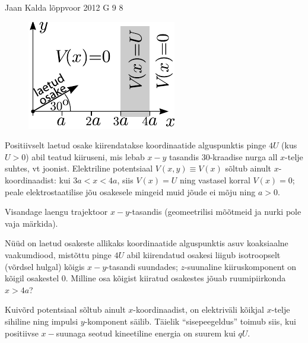 {Jaan Kalda} %
{lõppvoor} %
{2012} %
{G 9} %
{8} %
{
\ifStatement
\begin{figure}%
\vspace{-10pt}
\includegraphics[width=\linewidth]{2012-v3g-09-laeng}%
\end{figure}
Positiivselt laetud osake kiirendatakse koordinaatide alguspunktis pinge $4U$ (kus $U>0$) abil teatud kiiruseni, mis
lebab $x-y$ tasandis $30$-kraadise nurga all $x$-telje suhtes, vt joonist. Elektriline potentsiaal $V(x,y)\equiv V(x)$
sõltub ainult $x$-koordinaadist: kui
$3a<x<4a$, siis $V(x)=U$ ning vastasel korral $V(x)=0$; peale elektrostaatilise jõu osakesele mingeid muid jõude ei mõju ning $a>0$.

\osa Visandage laengu trajektoor $x-y$-tasandis (geomeetrilisi mõõtmeid ja nurki pole vaja märkida).

\osa Nüüd on laetud osakeste allikaks koordinaatide alguspunktis asuv koaksiaalne vaakumdiood, mistõttu pinge $4U$
abil kiirendatud osakesi liigub isotroopselt (võrdsel hulgal) kõigis $x-y$-tasandi suundades;
$z$-suunaline kiiruskomponent on kõigil osakestel 0. Milline osa kõigist kiiratud osakestes jõuab ruumipiirkonda $x>4a$?
\fi


\ifHint
Kuivõrd potentsiaal sõltub ainult $x$-koordinaadist, on elektriväli kõikjal $x$-telje sihiline ning
impulsi $y$-komponent säilib. Täielik \enquote{sisepeegeldus} toimub siis, kui positiivse $x-$suunaga 
seotud kineetiline energia on suurem kui $qU$.
\fi


}
